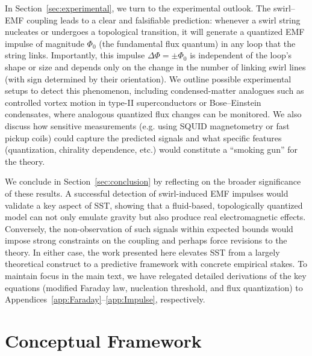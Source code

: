 \documentclass[12pt]{article}
\begin{document}
In Section~\ref{sec:experimental}, we turn to the experimental outlook. The swirl–EMF coupling leads to a clear and falsifiable prediction: whenever a swirl string nucleates or undergoes a topological transition, it will generate a quantized EMF impulse of magnitude $\Phi_{0}$ (the fundamental flux quantum) in any loop that the string links. Importantly, this impulse $\Delta\Phi=\pm \Phi_{0}$ is independent of the loop's shape or size and depends only on the change in the number of linking swirl lines (with sign determined by their orientation). We outline possible experimental setups to detect this phenomenon, including condensed-matter analogues such as controlled vortex motion in type-II superconductors or Bose–Einstein condensates, where analogous quantized flux changes can be monitored. We also discuss how sensitive measurements (e.g. using SQUID magnetometry or fast pickup coils) could capture the predicted signals and what specific features (quantization, chirality dependence, etc.) would constitute a ``smoking gun'' for the theory.


We conclude in Section~\ref{sec:conclusion} by reflecting on the broader significance of these results. A successful detection of swirl-induced EMF impulses would validate a key aspect of SST, showing that a fluid-based, topologically quantized model can not only emulate gravity but also produce real electromagnetic effects. Conversely, the non-observation of such signals within expected bounds would impose strong constraints on the coupling and perhaps force revisions to the theory. In either case, the work presented here elevates SST from a largely theoretical construct to a predictive framework with concrete empirical stakes. To maintain focus in the main text, we have relegated detailed derivations of the key equations (modified Faraday law, nucleation threshold, and flux quantization) to Appendices~\ref{app:Faraday}--\ref{app:Impulse}, respectively.


\section{Conceptual Framework}
    \label{sec:framework}
\end{document}
